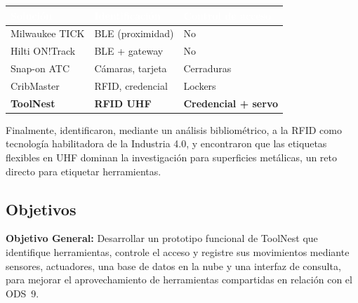 \begin{center}
\label{tab:comerciales}
\footnotesize
\setlength{\tabcolsep}{3pt}
\begin{tabularx}{\linewidth}{|>{\raggedright\arraybackslash}X|>{\raggedright\arraybackslash}X|>{\raggedright\arraybackslash}X|}
\hline
\rowcolor{headerblue}
\textcolor{white}{\textbf{Solución}} & \textcolor{white}{\textbf{Identificación}} & \textcolor{white}{\textbf{Control de acceso}} \\
\hline
Milwaukee TICK & BLE (proximidad) & No \\
Hilti ON!Track & BLE + gateway & No \\
Snap-on ATC & Cámaras, tarjeta & Cerraduras \\
CribMaster & RFID, credencial & Lockers \\
\textbf{ToolNest} & \textbf{RFID UHF} & \textbf{Credencial + servo} \\
\hline
\end{tabularx}
\end{center}

Finalmente, \textcite{soarespereira_rfid_2024} identificaron, mediante un análisis bibliométrico, a la RFID como tecnología habilitadora de la Industria 4.0, y \textcite{pereira_onmetal_2024} encontraron que las etiquetas flexibles en UHF dominan la investigación para superficies metálicas, un reto directo para etiquetar herramientas.

\subsection{Objetivos}
\textbf{Objetivo General:} Desarrollar un prototipo funcional de ToolNest que identifique herramientas, controle el acceso y registre sus movimientos mediante sensores, actuadores, una base de datos en la nube y una interfaz de consulta, para mejorar el aprovechamiento de herramientas compartidas en relación con el ODS~9.

